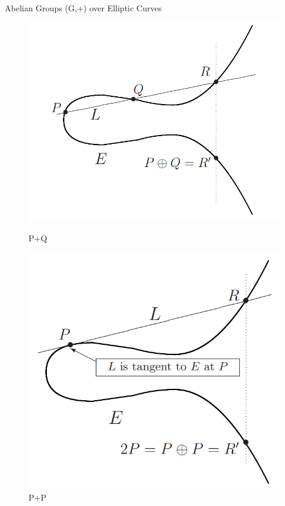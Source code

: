 \documentclass{beamer}
\begin{document}
\begin{frame}{Abelian Groups (G,+) over Elliptic Curves}
\begin{figure}
	\begin{minipage}{0.5\textwidth}
		\centering
		\includegraphics[width=1\linewidth]{P+Q}
		\caption{P+Q}\label{fig:p+q}
	\end{minipage}\hfill
	\begin{minipage}{0.48\textwidth}
		\centering
		\includegraphics[width=1\linewidth]{P+P}
		\caption{P+P}\label{fig:p+p}
	\end{minipage}
\end{figure}

\end{frame}
\end{document}
